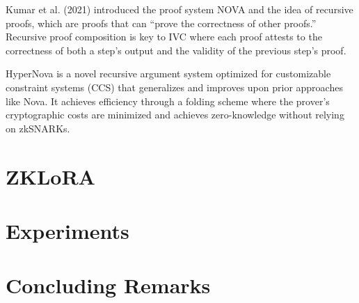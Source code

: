 \documentclass{article}
\begin{document}
Kumar et al. (2021) \cite{kothapalli2022nova} introduced the proof system NOVA and the idea of recursive proofs, which are proofs that can ``prove the correctness of other proofs.'' Recursive proof composition is key to IVC where each proof attests to the correctness of both a step’s output and the validity of the previous step’s proof.

HyperNova \cite{kothapalli2024hypernova} is a novel recursive argument system optimized for customizable constraint systems (CCS) that generalizes and improves upon prior approaches like Nova. It achieves efficiency through a folding scheme where the prover’s cryptographic costs are minimized and achieves zero-knowledge without relying on zkSNARKs.


\section{ZKLoRA}

\section{Experiments}



\section{Concluding Remarks}




\end{document}
